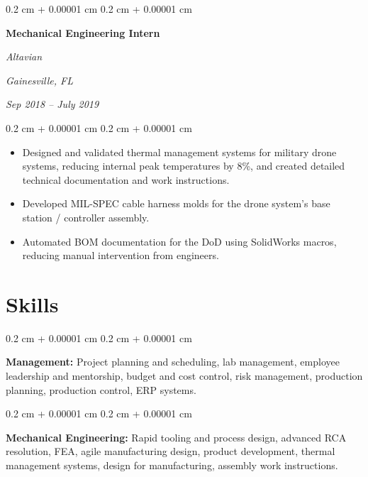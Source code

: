 \documentclass[10pt, letterpaper]{article}
\newenvironment{highlights}{
    \begin{itemize}[
        topsep=0.10 cm,
        parsep=0.10 cm,
        partopsep=0pt,
        itemsep=0pt,
        leftmargin=0.4 cm + 10pt
    ]
}{
    \end{itemize}
} %
\newenvironment{onecolentry}{
    \begin{adjustwidth}{
        0.2 cm + 0.00001 cm
    }{
        0.2 cm + 0.00001 cm
    }
}{
    \end{adjustwidth}
} %
\newenvironment{twocolentry}[2][]{
    \onecolentry
    \def\secondColumn{#2}
    \setcolumnwidth{\fill, 4.5 cm}
    \begin{paracol}{2}
}{
    \switchcolumn \raggedleft \secondColumn
    \end{paracol}
    \endonecolentry
} %
\begin{document}
        \vspace{0.35 cm}

        \begin{twocolentry}{
        \textit{Gainesville, FL}    
            
        \textit{Sep 2018 – July 2019}}
            \textbf{Mechanical Engineering Intern}
            
            \textit{Altavian}
        \end{twocolentry}

        \vspace{0.10 cm}
        \begin{onecolentry}
            \begin{highlights}
                \item Designed and validated thermal management systems for military drone systems, reducing internal peak temperatures by 8\%, and created detailed technical documentation and work instructions.
                \item Developed MIL-SPEC cable harness molds for the drone system’s base station / controller assembly.
                \item Automated BOM documentation for the DoD using SolidWorks macros, reducing manual intervention from engineers.
            \end{highlights}
        \end{onecolentry}


\vspace{0.4 cm}


    
    \section{Skills}


        \begin{onecolentry}
            \textbf{Management:} Project planning and scheduling, lab management, employee leadership and mentorship, budget and cost control, risk management, production planning, production control, ERP systems.
        \end{onecolentry}

        \vspace{0.2 cm}

        \begin{onecolentry}
            \textbf{Mechanical Engineering:} Rapid tooling and process design, advanced RCA resolution, FEA, agile manufacturing design, product development, thermal management systems, design for manufacturing, assembly work instructions.
        \end{onecolentry}
\end{document}
